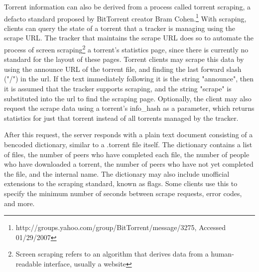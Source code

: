 \documentclass[a4paper,12pt]{report}
\begin{document}
Torrent information can also be derived from a process called torrent scraping, a defacto standard proposed by BitTorrent creator Bram Cohen.\footnote{http://groups.yahoo.com/group/BitTorrent/message/3275, Accessed 01/29/2007}
With scraping, clients can query the state of a torrent that a tracker is managing using the scrape URL. 
The tracker that maintains the scrape URL does so to automate the process of screen scraping\footnote{Screen scraping refers to an algorithm that derives data from a human-readable interface, usually a website} a torrent's statistics page, since there is currently no standard for the layout of these pages. 
Torrent clients may scrape this data by using the announce URL of the torrent file, and finding the last forward slash ("/") in the url. 
If the text immediately following it is the string "announce", then it is assumed that the tracker supports scraping, and the string "scrape" is substituted into the url to find the scraping page. 
Optionally, the client may also request the scrape data using a torrent's info\_hash as a parameter, which returns statistics for just that torrent instead of all torrents managed by the tracker. 


After this request, the server responds with a plain text document consisting of a bencoded dictionary, similar to a .torrent file itself. The dictionary contains a list of files, the number of peers who have completed each file, the number of people who have downloaded a torrent, the number of peers who have not yet completed the file, and the internal name. The dictionary may also include unofficial extensions to the scraping standard, known as flags. Some clients use this to specify the minimum number of seconds between scrape requests, error codes, and more.
\end{document}
